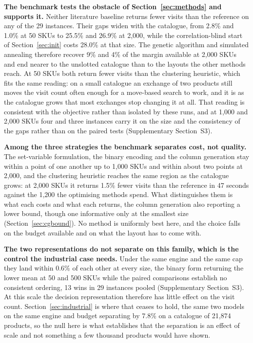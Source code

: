 \documentclass[]{interact}
\begin{document}
\textbf{The benchmark tests the obstacle of Section~\ref{sec:methods} and supports it.} Neither literature baseline returns fewer visits than the reference on any of the 29 instances. Their gaps widen with the catalogue, from 2.8\% and 1.0\% at 50 SKUs to 25.5\% and 26.9\% at 2,000, while the correlation-blind start of Section~\ref{sec:init} costs 28.0\% at that size. The genetic algorithm and simulated annealing therefore recover 9\% and 4\% of the margin available at 2,000 SKUs and end nearer to the unslotted catalogue than to the layouts the other methods reach. At 50 SKUs both return fewer visits than the clustering heuristic, which fits the same reading: on a small catalogue an exchange of two products still moves the visit count often enough for a move-based search to work, and it is as the catalogue grows that most exchanges stop changing it at all. That reading is consistent with the objective rather than isolated by these runs, and at 1,000 and 2,000 SKUs four and three instances carry it on the size and the consistency of the gaps rather than on the paired tests (Supplementary Section~S3).

\textbf{Among the three strategies the benchmark separates cost, not quality.} The set-variable formulation, the binary encoding and the column generation stay within a point of one another up to 1,000 SKUs and within about two points at 2,000, and the clustering heuristic reaches the same region as the catalogue grows: at 2,000 SKUs it returns 1.5\% fewer visits than the reference in 47 seconds against the 1,200 the optimising methods spend. What distinguishes them is what each costs and what each returns, the column generation also reporting a lower bound, though one informative only at the smallest size (Section~\ref{sec:cgbound}). No method is uniformly best here, and the choice falls on the budget available and on what the layout has to come with.

\textbf{The two representations do not separate on this family, which is the control the industrial case needs.} Under the same engine and the same cap they land within 0.6\% of each other at every size, the binary form returning the lower mean at 50 and 500 SKUs while the paired comparisons establish no consistent ordering, 13 wins in 29 instances pooled (Supplementary Section~S3). At this scale the decision representation therefore has little effect on the visit count. Section~\ref{sec:industrial} is where that ceases to hold, the same two models on the same engine and budget separating by 7.8\% on a catalogue of 21,874 products, so the null here is what establishes that the separation is an effect of scale and not something a few thousand products would have shown.
\end{document}

